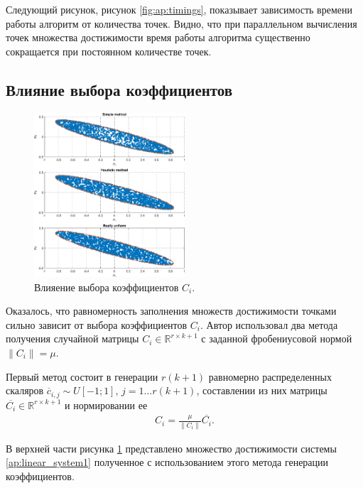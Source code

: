 \documentclass[../main.tex]{subfiles}
\begin{document}
  Следующий рисунок, рисунок \ref{fig:ap:timings}, показывает зависимость времени работы алгоритм от количества точек. 
  Видно, что при параллельном вычисления точек множества достижимости время работы алгоритма существенно сокращается при постоянном количестве точек. 
  
  \subsection{Влияние выбора коэффициентов }
  
     \begin{figure}[ht]
  	\centering
  	\includegraphics[width=0.5\textwidth]{images/three_linear_system_sets.eps}
  	\caption{Влияение выбора коэффициентов $C_i$.}
  	\label{fig:ap:coeffs_RS}
  \end{figure}
  
  Оказалось, что равномерность заполнения множеств достижимости точками сильно зависит от выбора коэффициентов $C_i$. 
  Автор использовал два метода получения случайной матрицы $C_i \in \mathbb{R}^{r \times k+1}$  с заданной фробениусовой нормой $ \|C_i\| = \mu$. 
  
  Первый метод состоит в генерации $r (k + 1)$ равномерно распределенных скаляров $\overline{c}_{i, j} \sim U[-1;1]$, $ j = 1\dots r (k + 1)$, составлении из них матрицы $\overline{C_i}  \in \mathbb{R}^{r \times k+1}$ и нормировании ее
  \begin{gather*}
  		C_i = \frac{\mu}{\|C_i\|}\overline{C_i}.
  \end{gather*}
  
  В верхней части рисунка \ref{fig:ap:coeffs_RS} представлено множество достижимости системы \eqref{ap:linear_system1} полученное с использованием этого метода генерации коэффициентов. 
 
\end{document}
